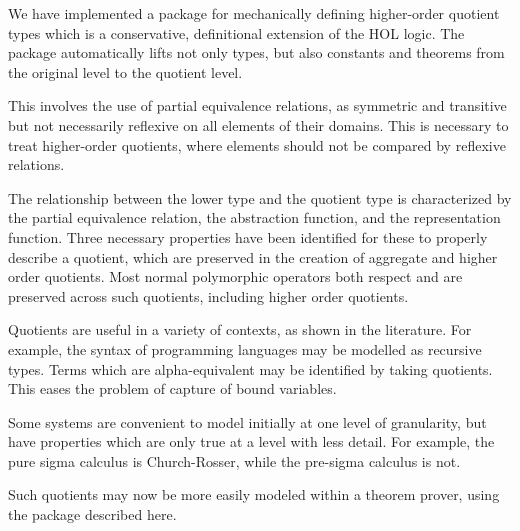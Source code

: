 \documentclass[envcountsame,runningheads]{llncs}
\newcommand{\quotient}{partial equivalence}
\begin{document}
We have implemented a package for mechanically defining higher-order
quotient types
which is a conservative, definitional extension of the HOL logic.
The package automatically lifts not only types,
but also constants and theorems from
the original level to the quotient level.

This involves the use of \quotient{} relations,
as symmetric and transitive but not necessarily reflexive
on all elements of their domains.  This is necessary to treat
higher-order quotients, where elements
should not be compared by reflexive relations.

The relationship between the lower type and the
quotient type
is characterized by the \quotient{} relation, the abstraction function,
and the representation function. 
Three necessary properties have been identified
for these to properly describe a quotient,
which are preserved in the creation of aggregate and higher order quotients.
Most normal polymorphic operators both respect and are preserved
across such quotients, including higher order quotients.

Quotients are useful in a variety of contexts, as shown in the literature.
%
%
For example, the syntax of programming languages may be modelled
as recursive types.
Terms which are alpha-equivalent 
may be identified by taking quotients.
This eases the problem of capture of bound variables.

Some systems
are convenient to model initially at one level of granularity, but
have properties which are only true at a
level with less detail.
For example, the pure sigma calculus is Church-Rosser,
while
the pre-sigma calculus
is not.

Such quotients may now be more easily modeled within a theorem prover,
using the package described here.

%
\end{document}
